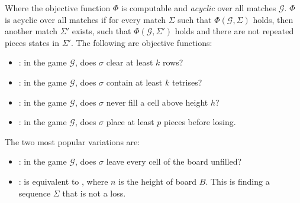 Where the objective function $\Phi$ is computable and \emph{acyclic} over all matches $\mathcal{G}$. $\Phi$ is acyclic over all matches if for every match $\Sigma$ such that $\Phi(\mathcal{G}, \Sigma)$ holds, then another match $\Sigma'$ exists, such that  $\Phi(\mathcal{G},\Sigma')$ holds and there are not repeated pieces states in $\Sigma'$. The following are objective functions:

\begin{itemize}
  \item {}: in the game $\mathcal{G}$, does $\sigma$ clear at least $k$ rows?
  \item {}: in the game $\mathcal{G}$, does $\sigma$ contain at least $k$ tetrises?
  \item {}: in the game $\mathcal{G}$, does $\sigma$ never fill a cell above height $h$?
  \item {}: in the game $\mathcal{G}$, does $\sigma$ place at least $p$ pieces before losing.
\end{itemize} 

The two most popular variations are:

\begin{itemize} \index{\clearing} \index{\survival}
  \item \clearing: in the game $\mathcal{G}$, does $\sigma$ leave every cell of the board unfilled?
  \item \survival: is equivalent to , where $n$ is the height of board $B$. This is finding a sequence $\Sigma$ that is not a loss.
\end{itemize}

